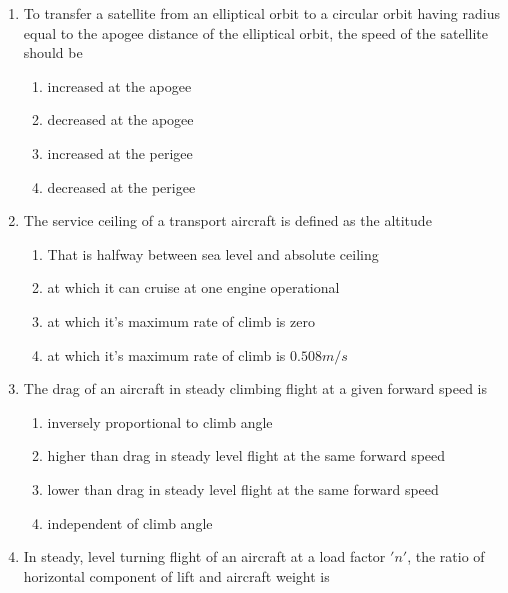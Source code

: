 \documentclass[journal]{IEEEtran}
\begin{document}
\begin{enumerate}
    \item To transfer a satellite from an elliptical orbit to a circular orbit having radius equal to the apogee distance of the elliptical orbit, the speed of the satellite should be

		\begin{multicols}{2}
			\begin{enumerate}
				\item increased at the apogee
				\item decreased at the apogee
				\item increased at the perigee
				\item decreased at the perigee
			\end{enumerate}
		\end{multicols}

    \item The service ceiling of a transport aircraft is defined as the altitude

       \begin{enumerate}
            \item That is halfway between sea level and absolute ceiling
            \item at which it can cruise at one engine operational
            \item at which it's maximum rate of climb is zero
            \item at which it's maximum rate of climb is $0.508m/s$
        \end{enumerate}
  
    \item The drag of an aircraft in steady climbing flight at a given forward speed is 

        \begin{enumerate}
            \item inversely proportional to climb angle
            \item higher than drag in steady level flight at the same forward speed
            \item lower than drag in steady level flight at the same forward speed
            \item independent of climb angle
        \end{enumerate}

    \item In steady, level turning flight of an aircraft at a load factor $'n'$, the ratio of horizontal component of lift and aircraft weight is


\end{enumerate}
\end{document}
